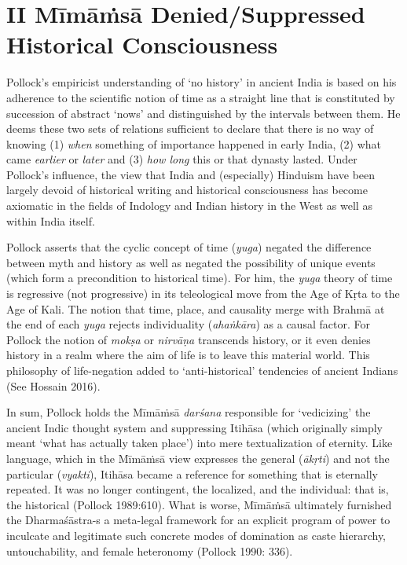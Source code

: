 \section*{II Mīmāṁsā Denied/Suppressed Historical Consciousness}

Pollock’s empiricist understanding of ‘no history’ in ancient India is based on his adherence to the scientific notion of time as a straight line that is constituted by succession of abstract ‘nows’ and distinguished by the intervals between them. He deems these two sets of relations sufficient to declare that there is no way of knowing (1) \textit{when} something of importance happened in early India, (2) what came \textit{earlier }or \textit{later} and (3) \textit{how long} this or that dynasty lasted. Under Pollock’s influence, the view that India and (especially) Hinduism have been largely devoid of historical writing and historical consciousness has become axiomatic in the fields of Indology and Indian history in the West as well as within India itself.

Pollock asserts that the cyclic concept of time (\textit{yuga}) negated the difference between myth and history as well as negated the possibility of unique events (which form a precondition to historical time). For him, the \textit{yuga} theory of time is regressive (not progressive) in its teleological move from the Age of Kṛta to the Age of Kali. The notion that time, place, and causality merge with Brahmā at the end of each \textit{yuga} rejects individuality (\textit{ahaṅkāra}) as a causal factor. For Pollock the notion of \textit{mokṣa} or \textit{nirvāṇa} transcends history, or it even denies history in a realm where the aim of life is to leave this material world. This philosophy of life-negation added to ‘anti-historical’ tendencies of ancient Indians (See Hossain 2016).

In sum, Pollock holds the Mīmāṁsā \textit{darśana} responsible for ‘vedicizing’ the ancient Indic thought system and suppressing Itihāsa (which originally simply meant ‘what has actually taken place’) into mere textualization of eternity. Like language, which in the Mīmāṁsā view expresses the general (\textit{ākṛti}) and not the particular (\textit{vyakti}), Itihāsa became a reference for something that is eternally repeated. It was no longer contingent, the localized, and the individual: that is, the historical (Pollock 1989:610). What is worse, Mīmāṁsā ultimately furnished the Dharmaśāstra-s a meta-legal framework for an explicit program of power to inculcate and legitimate such concrete modes of domination as caste hierarchy, untouchability, and female heteronomy (Pollock 1990: 336).


